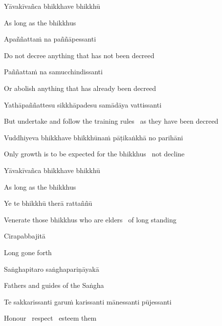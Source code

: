 Yāvakīvañca bhikkhave bhikkhū

\begin{english}
  As long as the bhikkhus
\end{english}

Apaññattaṁ na paññāpessanti

\begin{english}
  Do not decree anything that has not been decreed
\end{english}

Paññattaṁ na samucchindissanti

\begin{english}
  Or abolish anything that has already been decreed
\end{english}

Yathāpaññattesu sikkhāpadesu samādāya vattissanti

\begin{english}
  But undertake and follow the training rules \breathmark\ as they have been decreed
\end{english}

Vuddhiyeva bhikkhave bhikkhūnaṁ pāṭikaṅkhā no parihāni

\begin{english}
  Only growth is to be expected for the bhikkhus \breathmark\ not decline
\end{english}

Yāvakīvañca bhikkhave bhikkhū

\begin{english}
  As long as the bhikkhus
\end{english}

Ye te bhikkhū therā rattaññū

\begin{english}
  Venerate those bhikkhus who are elders \breathmark\ of long standing
\end{english}

Cirapabbajitā

\begin{english}
  Long gone forth
\end{english}

Saṅghapitaro saṅghapariṇāyakā

\begin{english}
  Fathers and guides of the Saṅgha
\end{english}

Te sakkarissanti garuṁ karissanti mānessanti pūjessanti

\begin{english}
  Honour \breathmark\ respect \breathmark\ esteem them
\end{english}

